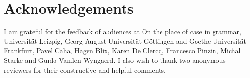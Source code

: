 \documentclass[11pt,a4paper]{article}
\begin{document}
\printbibliography

\section*{Acknowledgements}

I am grateful for the feedback of audiences at On the place of case in grammar, Universität Leizpig, Georg-August-Universität Göttingen and Goethe-Universität Frankfurt, Pavel Caha, Hagen Blix, Karen De Clercq, Francesco Pinzin, Michal Starke and Guido Vanden Wyngaerd. I also wish to thank two anonymous reviewers for their constructive and helpful comments.
\end{document}
